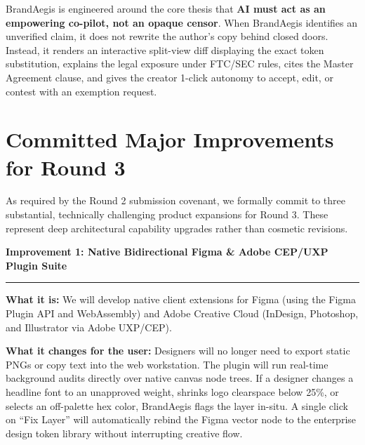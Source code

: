 \documentclass[10pt,a4paper]{article}
\begin{document}
\vspace{-0.25cm}
BrandAegis is engineered around the core thesis that \textbf{AI must act as an empowering co-pilot, not an opaque censor}. When BrandAegis identifies an unverified claim, it does not rewrite the author's copy behind closed doors. Instead, it renders an interactive split-view diff displaying the exact token substitution, explains the legal exposure under FTC/SEC rules, cites the Master Agreement clause, and gives the creator 1-click autonomy to accept, edit, or contest with an exemption request.

\newpage

\section{Committed Major Improvements for Round 3}
As required by the Round 2 submission covenant, we formally commit to three substantial, technically challenging product expansions for Round 3. These represent deep architectural capability upgrades rather than cosmetic revisions.

\begin{tcolorbox}[colback=white,colframe=brandblue,arc=2mm,boxrule=0.8pt,left=3.5mm,right=3.5mm,top=2.5mm,bottom=2.5mm]
\textbf{\large\color{brandblue}Improvement 1: Native Bidirectional Figma \& Adobe CEP/UXP Plugin Suite}
\vspace{0.1cm}
\hrule
\vspace{0.15cm}
\footnotesize
\textbf{What it is:} We will develop native client extensions for Figma (using the Figma Plugin API and WebAssembly) and Adobe Creative Cloud (InDesign, Photoshop, and Illustrator via Adobe UXP/CEP).

\textbf{What it changes for the user:} Designers will no longer need to export static PNGs or copy text into the web workstation. The plugin will run real-time background audits directly over native canvas node trees. If a designer changes a headline font to an unapproved weight, shrinks logo clearspace below 25\%, or selects an off-palette hex color, BrandAegis flags the layer in-situ. A single click on ``Fix Layer'' will automatically rebind the Figma vector node to the enterprise design token library without interrupting creative flow.
\end{tcolorbox}
\end{document}
